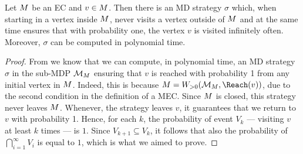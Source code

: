 \begin{lemma}
		\label{5-lem:EC-sweep}
Let $M$ be an EC and $v \in M$. Then there is an MD strategy $\sigma$ which, when starting in a vertex inside $M$, never visits a vertex outside of $ M $ and at the same time ensures that with probability one, the vertex $v$ is visited infinitely often. Moreover, $\sigma$ can be computed in polynomial time.
\end{lemma}
\begin{proof}
%
%
From  we know that we can compute, in polynomial time, an MD strategy $\sigma$ in the sub-MDP $ \mathcal{M}_M $ ensuring that $v$ is reached with probability 1 from any initial vertex in $ M $. Indeed, this is because $\mec = \winPos(\mdp_M,\Reach(v))$, due to the second condition in the definition of a MEC. Since $M$ is closed, this strategy never leaves $M$. Whenever, the strategy leaves $v$, it guarantees that we return to $v$ with probability 1. Hence, for each $k$, the probability of event $V_k$ --- visiting $v$ at least $k$ times --- is $1$. Since $V_{k+1}\subseteq V_k$, it follows that also the probability of $\bigcap_{i=1}^\infty V_i$ is equal to $1$, which is what we aimed to prove.
\end{proof}

